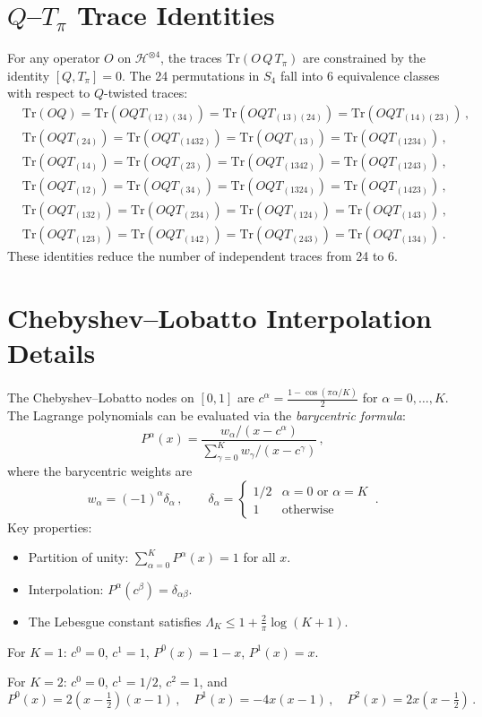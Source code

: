 \documentclass[11pt,a4paper]{article}
\theoremstyle{definition}
\theoremstyle{remark}
\newcommand{\HH}{\mathcal{H}}
\renewcommand{\Tr}{\mathrm{Tr}}
\begin{document}
\section{$Q$--$T_\pi$ Trace Identities}
\label{app:QT}

For any operator $O$ on $\HH^{\otimes 4}$, the traces $\Tr(O\,Q\,T_\pi)$ are constrained by the identity $[Q,T_\pi]=0$.  The 24 permutations in $S_4$ fall into 6 equivalence classes with respect to $Q$-twisted traces:
\begin{align}
  &\Tr(OQ) = \Tr(OQT_{(12)(34)}) = \Tr(OQT_{(13)(24)}) = \Tr(OQT_{(14)(23)})\,,\\
  &\Tr(OQT_{(24)}) = \Tr(OQT_{(1432)}) = \Tr(OQT_{(13)}) = \Tr(OQT_{(1234)})\,,\\
  &\Tr(OQT_{(14)}) = \Tr(OQT_{(23)}) = \Tr(OQT_{(1342)}) = \Tr(OQT_{(1243)})\,,\\
  &\Tr(OQT_{(12)}) = \Tr(OQT_{(34)}) = \Tr(OQT_{(1324)}) = \Tr(OQT_{(1423)})\,,\\
  &\Tr(OQT_{(132)}) = \Tr(OQT_{(234)}) = \Tr(OQT_{(124)}) = \Tr(OQT_{(143)})\,,\\
  &\Tr(OQT_{(123)}) = \Tr(OQT_{(142)}) = \Tr(OQT_{(243)}) = \Tr(OQT_{(134)})\,.
\end{align}
These identities reduce the number of independent traces from 24 to 6.

\section{Chebyshev--Lobatto Interpolation Details}
\label{app:cheb}

The Chebyshev--Lobatto nodes on $[0,1]$ are $c^\alpha = \frac{1-\cos(\pi\alpha/K)}{2}$ for $\alpha=0,\ldots,K$.  The Lagrange polynomials can be evaluated via the \emph{barycentric formula}:
\begin{equation}
  P^\alpha(x) = \frac{w_\alpha/(x-c^\alpha)}{\sum_{\gamma=0}^K w_\gamma/(x-c^\gamma)}\,,
\end{equation}
where the barycentric weights are
\begin{equation}
  w_\alpha = (-1)^\alpha \delta_\alpha\,,\qquad
  \delta_\alpha = \begin{cases} 1/2 & \alpha=0\text{ or }\alpha=K\\ 1 & \text{otherwise}\end{cases}\,.
\end{equation}
Key properties:
\begin{itemize}
  \item Partition of unity: $\sum_{\alpha=0}^K P^\alpha(x) = 1$ for all $x$.
  \item Interpolation: $P^\alpha(c^\beta) = \delta_{\alpha\beta}$.
  \item The Lebesgue constant satisfies $\Lambda_K \le 1 + \frac{2}{\pi}\log(K+1)$.
\end{itemize}

For $K=1$: $c^0=0$, $c^1=1$, $P^0(x)=1-x$, $P^1(x)=x$.

For $K=2$: $c^0=0$, $c^1=1/2$, $c^2=1$, and
\begin{equation}
  P^0(x) = 2(x-\tfrac{1}{2})(x-1)\,,\quad
  P^1(x) = -4x(x-1)\,,\quad
  P^2(x) = 2x(x-\tfrac{1}{2})\,.
\end{equation}
\end{document}
